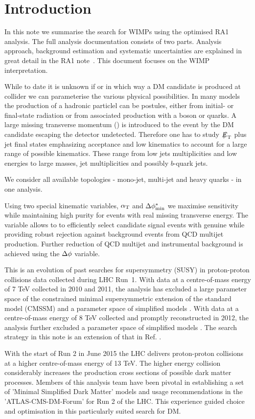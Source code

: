 \section{Introduction}
\label{sec:intro}

In this note we summarise the search for WIMPs using the optimised RA1 analysis. The full analysis documentation consists of two parts. Analysis approach, background estimation and systematic uncertainties are explained in great detail in the RA1 note~\cite{alphaTnote}. This document focuses on the WIMP interpretation.

While to date it is unknown if or in which way a DM candidate is produced at collider we can parameterise the various physical possibilities. In many models the production of a hadronic particlel can be postules, either from initial- or final-state radiation or from associated production with a boson or quarks.
A large missing transverse momentum (\MET) is introduced to the event by the DM candidate escaping the detector undetected. Therefore one has to study $\etmiss$ plus jet final states emphasizing acceptance and low kinematics to account for a large range of possible kinematics. These range from low jets multiplicities and low energies to large masses, jet multiplicities and possibly $b$-quark jets.

We consider all available topologies - mono-jet, multi-jet and heavy quarks - in one analysis. 

Using two special kinematic variables,  $\alpha_{\textrm T}$ and $\mbox{$\Delta\phi^{*}_{\rm min}$}$ we maximise sensitivity while maintaining high purity for events with real missing transverse energy.
The \alphat variable allows to to efficiently select candidate signal events with genuine \MET while
providing robust rejection against background events from QCD multijet production. Further reduction of QCD multijet and instrumental background is achieved using the $\Delta \phi$ variable.

This is an evolution of past searches for supersymmetry (SUSY) in proton-proton collisions data collected during LHC Run~1. With data at a centre-of-mass energy of 7 TeV collected in 2010 and 2011, the \alphat analysis has excluded a large parameter space of the constrained minimal supersymmetric extension of the standard model (CMSSM) \cite{Khachatryan:2011tk, Chatrchyan:2011zy, Chatrchyan:2012wa} and a parameter space of simplified models \cite{Chatrchyan:2012wa}. With data at a centre-of-mass energy of 8 TeV collected and promptly reconstructed in 2012, the \alphat analysis
further excluded a parameter space of simplified models \cite{Chatrchyan:2013lya}.  The search strategy in this note is an extension of that in Ref. \cite{CMS_AN_2013-366}.

With the start of Run 2 in June 2015 the LHC delivers proton-proton collisions at a higher centre-of-mass energy of 13 TeV. The higher energy collision considerably increases the production cross sections of possible dark matter processes. Members of this analysis team have been pivotal in establishing a set of 'Minimal Simplified Dark Matter' models and usage recommendations in the 'ATLAS-CMS-DM-Forum' for Run 2 of the LHC. This experience guided choice and optimisation in this particularly suited search for DM.
